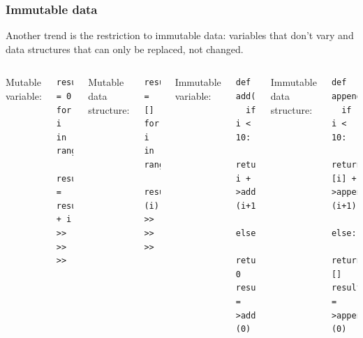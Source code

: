 \documentclass[compress]{beamer}
\begin{document}
\begin{frame}[fragile]
\frametitle{Immutable data}

Another trend is the restriction to immutable data: variables that don't vary and data structures that can only be replaced, not changed.

\vspace{0.5 cm}
\begin{columns}
Mutable variable:

\begin{lstlisting}[frame=single]
result = 0
for i in range(10):
  result = result + i
>>
>>
>>
\end{lstlisting}

\vspace{0.3 cm}
Mutable data structure:

\begin{lstlisting}[frame=single]
result = []
for i in range(10):
  result.>append>(i)
>>
>>
>>
\end{lstlisting}

Immutable variable:

\begin{lstlisting}[frame=single]
def add(i):
  if i < 10:
    return i + >add>(i+1)
  else:
    return 0
result = >add>(0)
\end{lstlisting}

\vspace{0.3 cm}
Immutable data structure:

\begin{lstlisting}[frame=single]
def appended(i):
  if i < 10:
    return [i] + >appended>(i+1)
  else:
    return []
result = >appended>(0)
\end{lstlisting}
\end{columns}
\end{frame}
\end{document}
